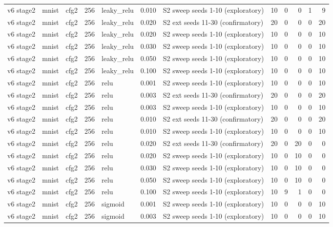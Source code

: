 \begin{table}[htbp]
{\begin{tabular}{@{}lllrlrlrrrrr@{}}
v6 stage2 & mnist & cfg2 & 256 & leaky\_relu & 0.010 & S2 sweep seeds 1-10 (exploratory) & 10 & 0 & 0 & 1 & 9 \\
v6 stage2 & mnist & cfg2 & 256 & leaky\_relu & 0.020 & S2 ext seeds 11-30 (confirmatory) & 20 & 0 & 0 & 0 & 20 \\
v6 stage2 & mnist & cfg2 & 256 & leaky\_relu & 0.020 & S2 sweep seeds 1-10 (exploratory) & 10 & 0 & 0 & 0 & 10 \\
v6 stage2 & mnist & cfg2 & 256 & leaky\_relu & 0.030 & S2 sweep seeds 1-10 (exploratory) & 10 & 0 & 0 & 0 & 10 \\
v6 stage2 & mnist & cfg2 & 256 & leaky\_relu & 0.050 & S2 sweep seeds 1-10 (exploratory) & 10 & 0 & 0 & 0 & 10 \\
v6 stage2 & mnist & cfg2 & 256 & leaky\_relu & 0.100 & S2 sweep seeds 1-10 (exploratory) & 10 & 0 & 0 & 0 & 10 \\
v6 stage2 & mnist & cfg2 & 256 & relu & 0.001 & S2 sweep seeds 1-10 (exploratory) & 10 & 0 & 0 & 0 & 10 \\
v6 stage2 & mnist & cfg2 & 256 & relu & 0.003 & S2 ext seeds 11-30 (confirmatory) & 20 & 0 & 0 & 0 & 20 \\
v6 stage2 & mnist & cfg2 & 256 & relu & 0.003 & S2 sweep seeds 1-10 (exploratory) & 10 & 0 & 0 & 0 & 10 \\
v6 stage2 & mnist & cfg2 & 256 & relu & 0.010 & S2 ext seeds 11-30 (confirmatory) & 20 & 0 & 0 & 0 & 20 \\
v6 stage2 & mnist & cfg2 & 256 & relu & 0.010 & S2 sweep seeds 1-10 (exploratory) & 10 & 0 & 0 & 0 & 10 \\
v6 stage2 & mnist & cfg2 & 256 & relu & 0.020 & S2 ext seeds 11-30 (confirmatory) & 20 & 0 & 20 & 0 & 0 \\
v6 stage2 & mnist & cfg2 & 256 & relu & 0.020 & S2 sweep seeds 1-10 (exploratory) & 10 & 0 & 10 & 0 & 0 \\
v6 stage2 & mnist & cfg2 & 256 & relu & 0.030 & S2 sweep seeds 1-10 (exploratory) & 10 & 0 & 10 & 0 & 0 \\
v6 stage2 & mnist & cfg2 & 256 & relu & 0.050 & S2 sweep seeds 1-10 (exploratory) & 10 & 0 & 10 & 0 & 0 \\
v6 stage2 & mnist & cfg2 & 256 & relu & 0.100 & S2 sweep seeds 1-10 (exploratory) & 10 & 9 & 1 & 0 & 0 \\
v6 stage2 & mnist & cfg2 & 256 & sigmoid & 0.001 & S2 sweep seeds 1-10 (exploratory) & 10 & 0 & 0 & 0 & 10 \\
v6 stage2 & mnist & cfg2 & 256 & sigmoid & 0.003 & S2 sweep seeds 1-10 (exploratory) & 10 & 0 & 0 & 0 & 10 \\

\end{tabular}}
\end{table}
